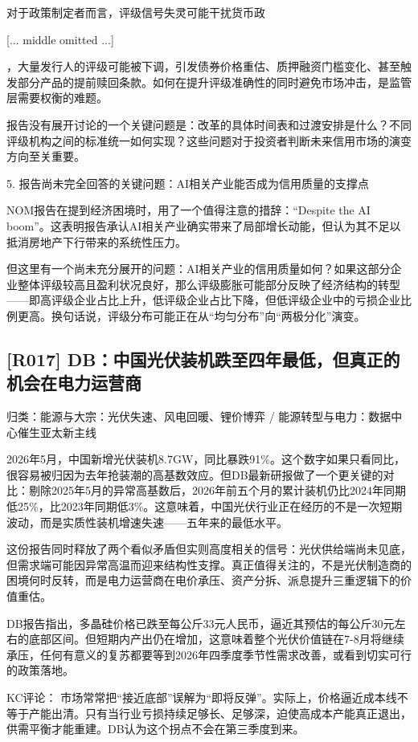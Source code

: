 \documentclass[11pt]{ctexart}
\begin{document}
对于政策制定者而言，评级信号失灵可能干扰货币政

[... middle omitted ...]

，大量发行人的评级可能被下调，引发债券价格重估、质押融资门槛变化、甚至触发部分产品的提前赎回条款。如何在提升评级准确性的同时避免市场冲击，是监管层需要权衡的难题。

报告没有展开讨论的一个关键问题是：改革的具体时间表和过渡安排是什么？不同评级机构之间的标准统一如何实现？这些问题对于投资者判断未来信用市场的演变方向至关重要。

5. 报告尚未完全回答的关键问题：AI相关产业能否成为信用质量的支撑点

NOM报告在提到经济困境时，用了一个值得注意的措辞：“Despite the AI boom”。这表明报告承认AI相关产业确实带来了局部增长动能，但认为其不足以抵消房地产下行带来的系统性压力。

但这里有一个尚未充分展开的问题：AI相关产业的信用质量如何？如果这部分企业整体评级较高且盈利状况良好，那么评级膨胀可能部分反映了经济结构的转型——即高评级企业占比上升，低评级企业占比下降，但低评级企业中的亏损企业比例更高。换句话说，评级分布可能正在从“均匀分布”向“两极分化”演变。

\subsection{[R017] DB：中国光伏装机跌至四年最低，但真正的机会在电力运营商}
{\small\color{refgray}归类：能源与大宗：光伏失速、风电回暖、锂价博弈 / 能源转型与电力：数据中心催生亚太新主线}

2026年5月，中国新增光伏装机8.7GW，同比暴跌91\%。这个数字如果只看同比，很容易被归因为去年抢装潮的高基数效应。但DB最新研报做了一个更关键的对比：剔除2025年5月的异常高基数后，2026年前五个月的累计装机仍比2024年同期低25\%，比2023年同期低3\%。这意味着，中国光伏行业正在经历的不是一次短期波动，而是实质性装机增速失速——五年来的最低水平。

这份报告同时释放了两个看似矛盾但实则高度相关的信号：光伏供给端尚未见底，但需求端可能因异常高温而迎来结构性支撑。真正值得关注的，不是光伏制造商的困境何时反转，而是电力运营商在电价承压、资产分拆、派息提升三重逻辑下的价值重估。

DB报告指出，多晶硅价格已跌至每公斤33元人民币，逼近其预估的每公斤30元左右的底部区间。但短期内产出仍在增加，这意味着整个光伏价值链在7-8月将继续承压，任何有意义的复苏都要等到2026年四季度季节性需求改善，或看到切实可行的政策落地。

KC评论： 市场常常把“接近底部”误解为“即将反弹”。实际上，价格逼近成本线不等于产能出清。只有当行业亏损持续足够长、足够深，迫使高成本产能真正退出，供需平衡才能重建。DB认为这个拐点不会在第三季度到来。
\end{document}
